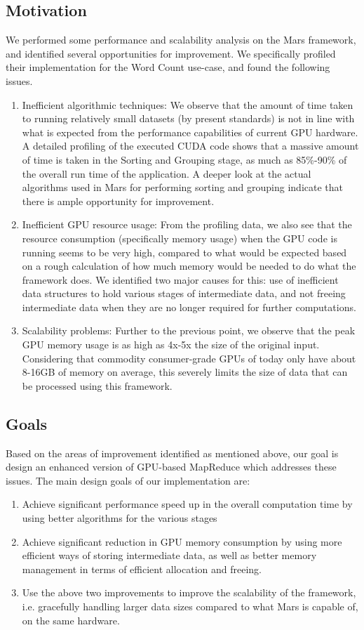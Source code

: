 \documentclass{article}
\begin{document}
\subsection{Motivation}
We performed some performance and scalability analysis on the Mars framework, and identified several opportunities for improvement. We specifically profiled their implementation for the Word Count use-case, and found the following issues. 
\begin{enumerate}
    \item Inefficient algorithmic techniques: We observe that the amount of time taken to running relatively small datasets (by present standards) is not in line with what is expected from the performance capabilities of current GPU hardware. A detailed profiling of the executed CUDA code shows that a massive amount of time is taken in the Sorting and Grouping stage, as much as 85\%-90\% of the overall run time of the application. A deeper look at the actual algorithms used in Mars for performing sorting and grouping indicate that there is ample opportunity for improvement.
    \item Inefficient GPU resource usage: From the profiling data, we also see that the resource consumption (specifically memory usage) when the GPU code is running seems to be very high, compared to what would be expected based on a rough calculation of how much memory would be needed to do what the framework does. We identified two major causes for this: use of inefficient data structures to hold various stages of intermediate data, and not freeing intermediate data when they are no longer required for further computations. 
    \item Scalability problems: Further to the previous point, we observe that the peak GPU memory usage is as high as 4x-5x the size of the original input. Considering that commodity consumer-grade GPUs of today only have about 8-16GB of memory on average, this severely limits the size of data that can be processed using this framework. 
\end{enumerate}

\subsection{Goals}
Based on the areas of improvement identified as mentioned above, our goal is design an enhanced version of GPU-based MapReduce which addresses these issues. The main design goals of our implementation are:
\begin{enumerate}
    \item Achieve significant performance speed up in the overall computation time by using better algorithms for the various stages
    \item Achieve significant reduction in GPU memory consumption by using more efficient ways of storing intermediate data, as well as better memory management in terms of efficient allocation and freeing.
    \item Use the above two improvements to improve the scalability of the framework, i.e. gracefully handling larger data sizes compared to what Mars is capable of, on the same hardware.
\end{enumerate}
\end{document}
